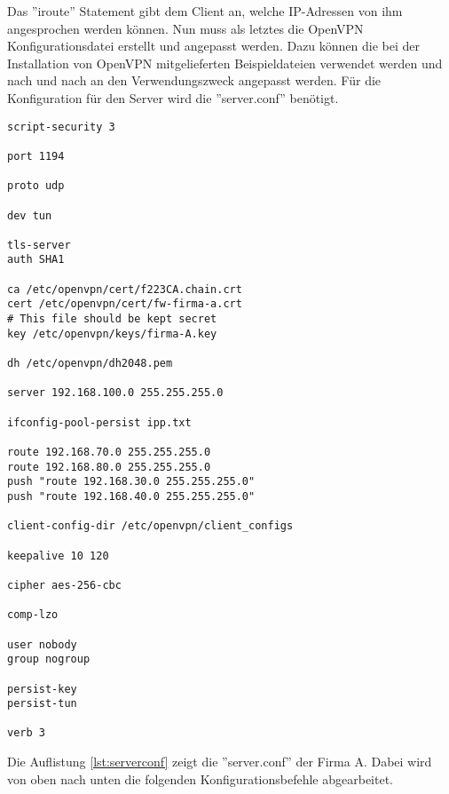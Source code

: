 \vspace{\baselineskip}
Das ''iroute'' Statement gibt dem Client an, welche IP-Adressen von ihm angesprochen werden können. \newline Nun muss als letztes die OpenVPN Konfigurationsdatei erstellt und angepasst werden. Dazu können die bei der Installation von OpenVPN mitgelieferten Beispieldateien verwendet werden und nach und nach an den Verwendungszweck angepasst werden. Für die Konfiguration für den Server wird die ''server.conf'' benötigt.\newline
\lstset{
	basicstyle=\footnotesize, frame=tb,
	xleftmargin=.2\textwidth, xrightmargin=.2\textwidth
}
\begin{lstlisting}[caption={server.conf Datei der Firma A},label=lst:serverconf]
script-security 3

port 1194

proto udp

dev tun

tls-server
auth SHA1

ca /etc/openvpn/cert/f223CA.chain.crt
cert /etc/openvpn/cert/fw-firma-a.crt
# This file should be kept secret
key /etc/openvpn/keys/firma-A.key  

dh /etc/openvpn/dh2048.pem

server 192.168.100.0 255.255.255.0

ifconfig-pool-persist ipp.txt

route 192.168.70.0 255.255.255.0
route 192.168.80.0 255.255.255.0
push "route 192.168.30.0 255.255.255.0"
push "route 192.168.40.0 255.255.255.0"

client-config-dir /etc/openvpn/client_configs

keepalive 10 120

cipher aes-256-cbc

comp-lzo

user nobody	
group nogroup

persist-key
persist-tun

verb 3

\end{lstlisting}
\vspace{\baselineskip}
Die Auflistung \ref{lst:serverconf} zeigt die ''server.conf'' der Firma A. Dabei wird von oben nach unten die folgenden Konfigurationsbefehle abgearbeitet.
